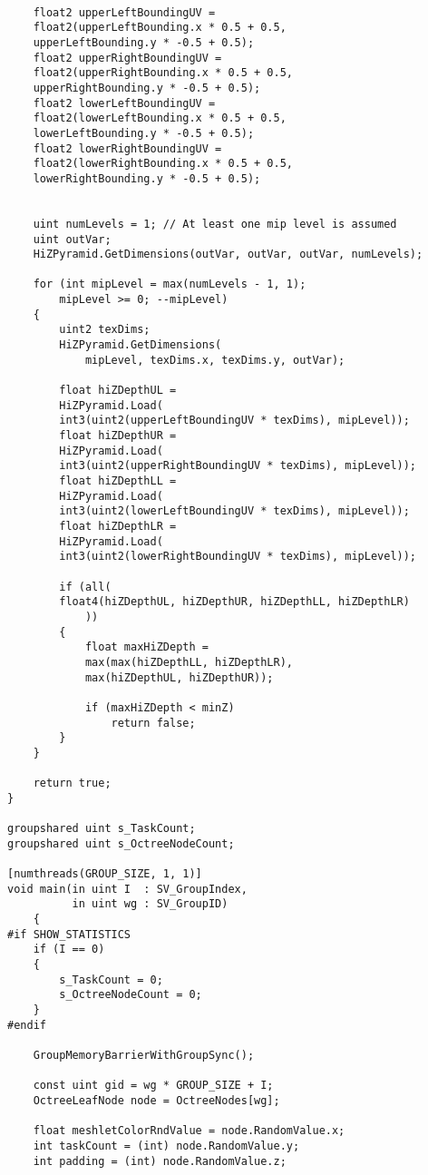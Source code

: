 \begin{lstlisting}
    
    float2 upperLeftBoundingUV = 
    float2(upperLeftBounding.x * 0.5 + 0.5, 
    upperLeftBounding.y * -0.5 + 0.5);
    float2 upperRightBoundingUV = 
    float2(upperRightBounding.x * 0.5 + 0.5, 
    upperRightBounding.y * -0.5 + 0.5);
    float2 lowerLeftBoundingUV = 
    float2(lowerLeftBounding.x * 0.5 + 0.5, 
    lowerLeftBounding.y * -0.5 + 0.5);
    float2 lowerRightBoundingUV = 
    float2(lowerRightBounding.x * 0.5 + 0.5, 
    lowerRightBounding.y * -0.5 + 0.5);
    
    
    uint numLevels = 1; // At least one mip level is assumed
    uint outVar;
    HiZPyramid.GetDimensions(outVar, outVar, outVar, numLevels);
  
    for (int mipLevel = max(numLevels - 1, 1); 
        mipLevel >= 0; --mipLevel)
    {
        uint2 texDims;
        HiZPyramid.GetDimensions(
            mipLevel, texDims.x, texDims.y, outVar);
        
        float hiZDepthUL = 
        HiZPyramid.Load(
        int3(uint2(upperLeftBoundingUV * texDims), mipLevel));
        float hiZDepthUR = 
        HiZPyramid.Load(
        int3(uint2(upperRightBoundingUV * texDims), mipLevel));
        float hiZDepthLL = 
        HiZPyramid.Load(
        int3(uint2(lowerLeftBoundingUV * texDims), mipLevel));
        float hiZDepthLR = 
        HiZPyramid.Load(
        int3(uint2(lowerRightBoundingUV * texDims), mipLevel));
        
        if (all(
        float4(hiZDepthUL, hiZDepthUR, hiZDepthLL, hiZDepthLR)
            ))
        {
            float maxHiZDepth = 
            max(max(hiZDepthLL, hiZDepthLR), 
            max(hiZDepthUL, hiZDepthUR));
        
            if (maxHiZDepth < minZ)
                return false;
        }
    }
    
    return true;
}

groupshared uint s_TaskCount;
groupshared uint s_OctreeNodeCount;

[numthreads(GROUP_SIZE, 1, 1)]
void main(in uint I  : SV_GroupIndex,
          in uint wg : SV_GroupID)
    {
#if SHOW_STATISTICS
    if (I == 0)
    {
        s_TaskCount = 0;
        s_OctreeNodeCount = 0;
    }
#endif

    GroupMemoryBarrierWithGroupSync();

    const uint gid = wg * GROUP_SIZE + I;    
    OctreeLeafNode node = OctreeNodes[wg];
    
    float meshletColorRndValue = node.RandomValue.x;
    int taskCount = (int) node.RandomValue.y;
    int padding = (int) node.RandomValue.z;


\end{lstlisting}
